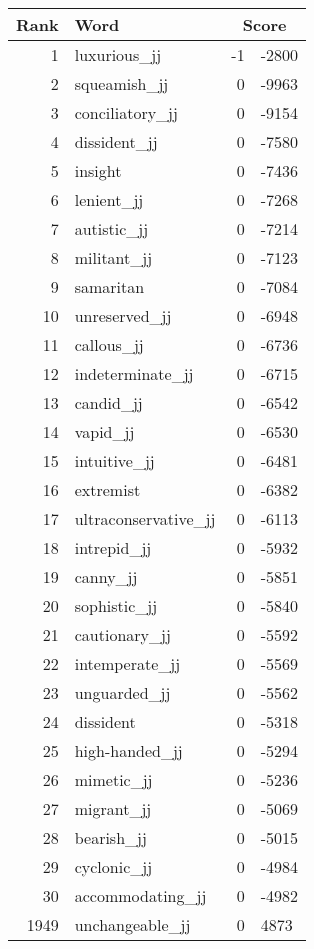 \begin{longtable}[!htbp]{| rlr@{.}l |}
    \hline
    \textbf{Rank} & \textbf{Word} & \multicolumn{2}{c|}{\textbf{Score}} \\
    \hline
    \endhead
    1 & luxurious\_jj & -1 & -2800 \\
    2 & squeamish\_jj & 0 & -9963 \\
    3 & conciliatory\_jj & 0 & -9154 \\
    4 & dissident\_jj & 0 & -7580 \\
    5 & insight & 0 & -7436 \\
    6 & lenient\_jj & 0 & -7268 \\
    7 & autistic\_jj & 0 & -7214 \\
    8 & militant\_jj & 0 & -7123 \\
    9 & samaritan & 0 & -7084 \\
    10 & unreserved\_jj & 0 & -6948 \\
    11 & callous\_jj & 0 & -6736 \\
    12 & indeterminate\_jj & 0 & -6715 \\
    13 & candid\_jj & 0 & -6542 \\
    14 & vapid\_jj & 0 & -6530 \\
    15 & intuitive\_jj & 0 & -6481 \\
    16 & extremist & 0 & -6382 \\
    17 & ultraconservative\_jj & 0 & -6113 \\
    18 & intrepid\_jj & 0 & -5932 \\
    19 & canny\_jj & 0 & -5851 \\
    20 & sophistic\_jj & 0 & -5840 \\
    21 & cautionary\_jj & 0 & -5592 \\
    22 & intemperate\_jj & 0 & -5569 \\
    23 & unguarded\_jj & 0 & -5562 \\
    24 & dissident & 0 & -5318 \\
    25 & high-handed\_jj & 0 & -5294 \\
    26 & mimetic\_jj & 0 & -5236 \\
    27 & migrant\_jj & 0 & -5069 \\
    28 & bearish\_jj & 0 & -5015 \\
    29 & cyclonic\_jj & 0 & -4984 \\
    30 & accommodating\_jj & 0 & -4982 \\
    1949 & unchangeable\_jj & 0 & 4873 \\

\end{longtable}
